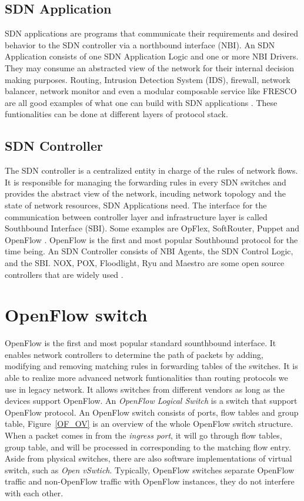 \subsection{SDN Application}
\label{SDN Application}
SDN applications are programs that communicate their requirements and desired behavior to the SDN controller via a northbound interface (NBI). An SDN Application consists of one SDN Application Logic and one or more NBI Drivers. They may consume an abstracted view of the network for their internal decision making purposes. Routing, Intrusion Detection System (IDS), firewall, network balancer, network monitor and even a modular composable service like FRESCO are all good examples of what one can build with SDN applications \cite{FRESCO}. These funtionalities can be done at different layers of protocol stack.

\subsection{SDN Controller}
\label{SDN Controller}
The SDN controller is a centralized entity in charge of the rules of network flows. It is responsible for managing the forwarding rules in every SDN switches and provides the abstract view of the network, incuding network topology and the state of network resources, SDN Applications need. The interface for the communication between controller layer and infrastructure layer is called Southbound Interface (SBI). Some examples are OpFlex, SoftRouter, Puppet and OpenFlow \cite{LNRSW04}. OpenFlow is the first and most popular Southbound protocol for the time being. An SDN Controller consists of NBI Agents, the SDN Control Logic, and the SBI. NOX, POX, Floodlight, Ryu and Maestro are some open source controllers that are widely used \cite{GKPPCMS08,MBF}.

\section{OpenFlow switch}
\label{OpenFlow switch}
OpenFlow is the first and most popular standard sounthbound interface. It enables network controllers to determine the path of packets by adding, modifying and removing matching rules in forwarding tables of the switches. It is able to realize more advanced network funtionalities than routing protocols we use in legacy network. It allows switches from different vendors as long as the devices support OpenFlow. An \textit{OpenFlow Logical Switch} is a switch that support OpenFlow protocol. An OpenFlow switch consists of ports, flow tables and group table, Figure~\ref{OF_OV} is an overview of the whole OpenFlow switch structure. When a packet comes in from the \textit{ingress port}, it will go through flow tables, group table, and will be processed in corresponding to the matching flow entry. Aside from physical switches, there are also software implementations of virtual switch, such as \textit{Open vSwtich}. Typically, OpenFlow switches separate OpenFlow traffic and non-OpenFlow traffic with OpenFlow instances, they do not interfere with each other. \cite{HP_SPEC}

